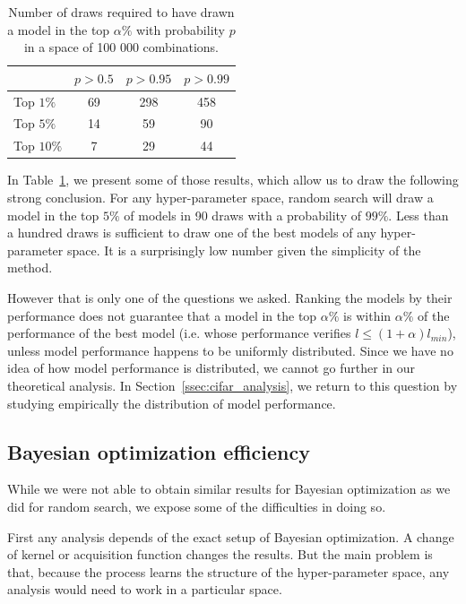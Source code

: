 \begin{table}[htb]
	\centering
	\begin{tabular}{ | l | c | c | c | }
		\hline
		 & $p > 0.5$ & $p > 0.95$ & $p > 0.99$ \\ 
		\hline
		Top $1 \%$ & 69 & 298 & 458 \\
		Top $5 \%$ & 14 & 59 & 90 \\
		Top $10 \%$ & 7 & 29 & 44 \\
		\hline
	\end{tabular}
	\caption[Theoretical performance of random search]{Number of draws required to have drawn a model in the top $\alpha \%$ with probability $p$ in a space of 100 000 combinations.}
	\label{table:random_search_bounds}
\end{table}

In Table~\ref{table:random_search_bounds}, we present some of those results, which allow us to draw the following strong conclusion. For any hyper-parameter space, random search will draw a model in the top $5 \%$ of models in 90 draws with a probability of $99 \%$. Less than a hundred draws is sufficient to draw one of the best models of any hyper-parameter space. It is a surprisingly low number given the simplicity of the method.

However that is only one of the questions we asked. Ranking the models by their performance does not guarantee that a model in the top $\alpha \%$ is within $\alpha \%$ of the performance of the best model (i.e. whose performance verifies $l \leq (1 + \alpha) l_{min}$), unless model performance happens to be uniformly distributed. Since we have no idea of how model performance is distributed, we cannot go further in our theoretical analysis. In Section~\ref{ssec:cifar_analysis}, we return to this question by studying empirically the distribution of model performance.

\subsection{Bayesian optimization efficiency}

While we were not able to obtain similar results for Bayesian optimization as we did for random search, we expose some of the difficulties in doing so.

First any analysis depends of the exact setup of Bayesian optimization. A change of kernel or acquisition function changes the results. But the main problem is that, because the process learns the structure of the hyper-parameter space, any analysis would need to work in a particular space.


